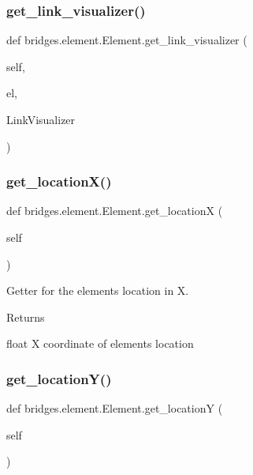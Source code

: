 \subsubsection{\texorpdfstring{get\+\_\+link\+\_\+visualizer()}{get\_link\_visualizer()}}
{\footnotesize\ttfamily def bridges.\+element.\+Element.\+get\+\_\+link\+\_\+visualizer (\begin{DoxyParamCaption}\item[{}]{self,  }\item[{}]{el,  }\item[{}]{Link\+Visualizer }\end{DoxyParamCaption})}

\mbox{\label{classbridges_1_1element_1_1_element_aa921953dab3cec5253e813bb1709895a}} 
\subsubsection{\texorpdfstring{get\+\_\+location\+X()}{get\_locationX()}}
{\footnotesize\ttfamily def bridges.\+element.\+Element.\+get\+\_\+locationX (\begin{DoxyParamCaption}\item[{}]{self }\end{DoxyParamCaption})}



Getter for the element\textquotesingle{}s location in X. 

\begin{DoxyReturn}{Returns}


float X coordinate of element\textquotesingle{}s location 
\end{DoxyReturn}
\mbox{\label{classbridges_1_1element_1_1_element_a108f62843d084beaf5fcf5fd202853c5}} 
\subsubsection{\texorpdfstring{get\+\_\+location\+Y()}{get\_locationY()}}
{\footnotesize\ttfamily def bridges.\+element.\+Element.\+get\+\_\+locationY (\begin{DoxyParamCaption}\item[{}]{self }\end{DoxyParamCaption})}



